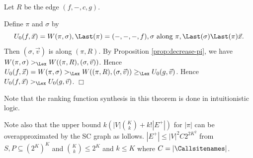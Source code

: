 Let $R$ be the edge $(f,-,c,g)$.

Define $\pi$ and $\sigma$ by
\[
U_0(f,\Vec x)=W(\pi,\sigma), \\
\Last(\pi) = (-,-,-,f), \\
\sigma \hbox{\ along\ } \pi,
\Last(\sigma) \Last(\pi) \Vec x.
\]
Then 
$(\sigma,\Vec v)$ is along $(\pi,R)$.
By Proposition \ref{prop:decrease-pi},
we have
$W(\pi,\sigma) >_\Lex W((\pi,R),(\sigma,\Vec v))$.
Hence
$U_0(f,\Vec x) =
W(\pi,\sigma) >_\Lex W((\pi,R),(\sigma,\Vec v))
\ge_\Lex U_0(g,\Vec v)$.
Hence $U_0(f,\Vec x) >_\Lex U_0(g,\Vec v)$.
$\Box$

Note that the ranking function synthesis in this theorem
is done in intuitionistic logic.

Note also that the upper bound $k(|V|{K \choose k}+k!|E^+|)$ for $|\pi|$
can be overapproximated by the SC graph as lollows.
$|E^+| \le |V|^2C2^{2K^2}$ from $S,P \subseteq (2^K)^K$
and ${K \choose k} \le 2^K$
and $k \le K$ where $C = |\Callsitenames|$.

